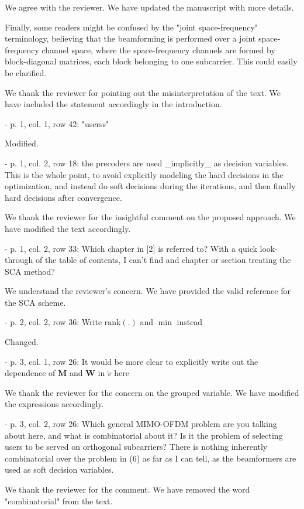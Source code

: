 \resp We agree with the reviewer. We have updated the manuscript with more details. 

 Finally, some readers might be confused by the "joint space-frequency" terminology, believing that the beamforming is performed over a joint space-frequency channel space, where the space-frequency channels are formed by block-diagonal matrices, each block belonging to one subcarrier. This could easily be clarified. 

\resp We thank the reviewer for pointing out the misinterpretation of the text. We have included the statement accordingly in the introduction.

 - p. 1, col. 1, row 42: "userss"

\resp Modified.

 - p. 1, col. 2, row 18: the precoders are used \_implicitly\_ as decision variables. This is the whole point, to avoid explicitly modeling the hard decisions in the optimization, and instead do soft decisions during the iterations, and then finally hard decisions after convergence.

\resp We thank the reviewer for the insightful comment on the proposed approach. We have modified the text accordingly.

 - p. 1, col. 2, row 33: Which chapter in [2] is referred to? With a quick look-through of the table of contents, I can't find and chapter or section treating the SCA method?

\resp We understand the reviewer's concern. We have provided the valid reference for the SCA scheme.

 - p. 2, col. 2, row 36: Write $\text{rank}(.)$ and $\min$ instead

\resp Changed.

 - p. 3, col. 1, row 26: It would be more clear to explicitly write out the dependence of $\mathbf{M}$ and $\mathbf{W}$ in $\tilde{v}$ here

\resp We thank the reviewer for the concern on the grouped variable. We have modified the expressions accordingly.

 - p. 3, col. 2, row 26: Which general MIMO-OFDM problem are you talking about here, and what is combinatorial about it? Is it the problem of selecting users to be served on orthogonal subcarriers? There is nothing inherently combinatorial over the problem in (6) as far as I can tell, as the beamformers are used as soft decision variables.

\resp We thank the reviewer for the comment. We have removed the word "combinatorial" from the text. 


